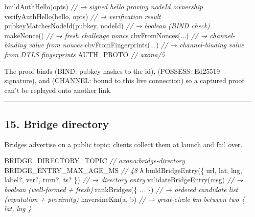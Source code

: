 \documentclass[
  nobib]{tufte-handout}
\newenvironment{Shaded}{}{}
\newcommand{\CommentTok}[1]{\textcolor[rgb]{0.38,0.63,0.69}{\textit{#1}}}
\newcommand{\FunctionTok}[1]{\textcolor[rgb]{0.02,0.16,0.49}{#1}}
\newcommand{\NormalTok}[1]{#1}
\newcommand{\OperatorTok}[1]{\textcolor[rgb]{0.40,0.40,0.40}{#1}}
\begin{document}
\begin{Shaded}
\begin{Highlighting}[]
\FunctionTok{buildAuthHello}\NormalTok{(opts)                  }\CommentTok{// → signed hello proving nodeId ownership}
\FunctionTok{verifyAuthHello}\NormalTok{(hello}\OperatorTok{,}\NormalTok{ opts)          }\CommentTok{// → verification result}
\FunctionTok{pubkeyMatchesNodeId}\NormalTok{(pubkey}\OperatorTok{,}\NormalTok{ nodeId)   }\CommentTok{// → boolean (BIND check)}
\FunctionTok{makeNonce}\NormalTok{()                           }\CommentTok{// → fresh challenge nonce}
\FunctionTok{cbvFromNonces}\NormalTok{(}\OperatorTok{...}\NormalTok{)                    }\CommentTok{// → channel{-}binding value from nonces}
\FunctionTok{cbvFromFingerprints}\NormalTok{(}\OperatorTok{...}\NormalTok{)              }\CommentTok{// → channel{-}binding value from DTLS fingerprints}
\NormalTok{AUTH\_PROTO                            }\CommentTok{// \textquotesingle{}axona/5\textquotesingle{}}
\end{Highlighting}
\end{Shaded}

The proof binds (BIND: pubkey hashes to the id), (POSSESS: Ed25519
signature), and (CHANNEL: bound to this live connection) so a captured
proof can't be replayed onto another link.

\begin{center}\rule{0.5\linewidth}{0.5pt}\end{center}

\subsection{15. Bridge directory}\label{bridge-directory}

Bridges advertise on a public topic; clients collect them at launch and
fail over.

\begin{Shaded}
\begin{Highlighting}[]
\NormalTok{BRIDGE\_DIRECTORY\_TOPIC               }\CommentTok{// \textquotesingle{}axona:bridge{-}directory\textquotesingle{}}
\NormalTok{BRIDGE\_ENTRY\_MAX\_AGE\_MS              }\CommentTok{// 48 h}
\FunctionTok{buildBridgeEntry}\NormalTok{(\{ url}\OperatorTok{,}\NormalTok{ lat}\OperatorTok{,}\NormalTok{ lng}\OperatorTok{,}\NormalTok{ label}\OperatorTok{?,}\NormalTok{ ver}\OperatorTok{?,}\NormalTok{ turn}\OperatorTok{?,}\NormalTok{ ts}\OperatorTok{?}\NormalTok{ \})  }\CommentTok{// → directory entry}
\FunctionTok{validateBridgeEntry}\NormalTok{(msg)             }\CommentTok{// → boolean (well{-}formed + fresh)}
\FunctionTok{rankBridges}\NormalTok{(\{ }\OperatorTok{...}\NormalTok{ \})                 }\CommentTok{// → ordered candidate list (reputation + proximity)}
\FunctionTok{haversineKm}\NormalTok{(a}\OperatorTok{,}\NormalTok{ b)                    }\CommentTok{// → great{-}circle km between two \{ lat, lng \}}
\end{Highlighting}
\end{Shaded}
\end{document}
